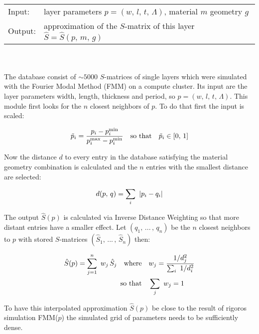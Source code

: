 \begin{tabular}{ll}
    \toprule
    Input: & layer parameters $p = (w, \, l, \, t, \, \Lambda)$, material $m$ geometry $g$ \\
    Output: & approximation of the $S$-matrix of this layer $\hat{S} = \hat{S}(p, \, m, \, g)$\\
    \bottomrule
\end{tabular}
\\
\\
The database consist of $\sim 5000$ $S$-matrices of single layers which were simulated with the Fourier Modal Method (FMM) on a compute cluster. Its input are the layer parameters width, length, thickness and period, so $p = (w, \, l, \, t, \, \Lambda)$. This module first looks for the $n$ closest neighbors of $p$. To do that first the input is scaled:

\begin{equation}
    \tilde{p}_i = \frac{p_i - p_i^\s{min}}{p_i^\s{max} - p_i^\s{min}}
    \qq{so that} \tilde{p}_i \in [0, \, 1]
\end{equation}

\noindent
Now the distance $d$ to every entry in the database satisfying the material geometry combination is calculated and the $n$ entries with the smallest distance are selected:

\begin{equation}
    d(p, \,q) = \sum_i \ \qty|p_i - q_i|
\end{equation}

\noindent
The output $\hat{S}(p)$ is calculated via Inverse Distance Weighting \cite{Shepard1968} so that more distant entries have a smaller effect. Let
$(q_1, \, ... \, , \, q_n)$ be the $n$ closest neighbors to $p$ with stored $S$-matrices
$(\hat{S}_1, \, ... \, , \, \hat{S}_n)$
then:

\begin{equation}
\begin{aligned}
    \hat{S}(p) = \sum_{j=1}^n \ w_j \, \hat{S}_j
    \qq{where}& w_j = \frac{1 / d_j^2}{\sum_i \ 1 / d^2_i} \\
    \qq*{so that} &\sum_j \ w_j = 1
\end{aligned}
\end{equation}

\noindent
To have this interpolated approximation $\hat{S}(p)$ be close to the result of rigoros simulation FMM($p$) the simulated grid of parameters needs to be sufficiently dense. 

